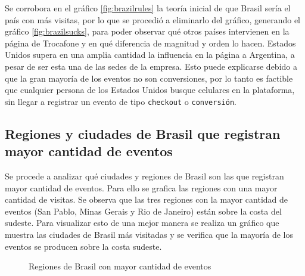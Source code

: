 \documentclass[a4paper]{article}
\begin{document}
Se corrobora en el gráfico \ref{fig:brazilrules} la teoría inicial de que Brasil sería el país con más visitas, por lo que se procedió a eliminarlo del gráfico, generando el gráfico \ref{fig:brazilsucks}, para poder observar qué otros países intervienen en la página de Trocafone y en qué diferencia de magnitud y orden lo hacen. Estados Unidos supera en una amplia cantidad la influencia en la página a Argentina, a pesar de ser esta una de las sedes de la empresa. Esto puede explicarse debido a que la gran mayoría de los eventos no son conversiones, por lo tanto es factible que cualquier persona de los Estados Unidos busque celulares en la plataforma, sin llegar a registrar un evento de tipo \texttt{checkout} o \texttt{conversión}.

\subsection{Regiones y ciudades de Brasil que registran mayor cantidad de eventos}

Se procede a analizar qué ciudades y regiones de Brasil son las que registran mayor cantidad de eventos. Para ello se grafica las regiones con una mayor cantidad de visitas. Se observa que las tres regiones con la mayor cantidad de eventos (San Pablo, Minas Gerais y Rio de Janeiro) están sobre la costa del sudeste. Para visualizar esto de una mejor manera se realiza un gráfico que muestra las ciudades de Brasil más visitadas y se verifica que la mayoría de los eventos se producen sobre la costa sudeste.

\begin{figure}[!h]
	\caption{Regiones de Brasil con mayor cantidad de eventos}
	\label{fig:regionsbrasil}
\end{figure}
\end{document}
